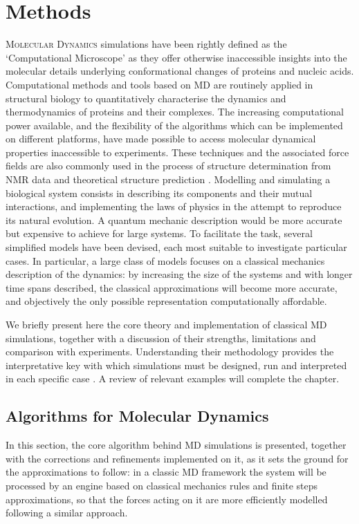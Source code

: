 \chapter{Methods} \label{chapter:MD}

\lettrine{M}{olecular Dynamics} simulations have been rightly defined as the `Computational Microscope' \cite{Lee2009,Dror2012} as they offer otherwise inaccessible insights into the molecular details underlying conformational changes of proteins and nucleic acids. Computational methods and tools based on MD are routinely applied in structural biology to quantitatively characterise the dynamics and thermodynamics of proteins and their complexes. The increasing computational power available, and the flexibility of the algorithms which can be implemented on different platforms, have made possible to access molecular dynamical properties inaccessible to experiments. These techniques and the associated force fields are also commonly used in the process of structure determination from NMR data and theoretical structure prediction \cite{Vogel2017,Heo2018}.
%
Modelling and simulating a biological system consists in describing its components and their mutual interactions, and implementing the laws of physics in the attempt to reproduce its natural evolution. A quantum mechanic description would be more accurate but expensive to achieve for large systems. To facilitate the task, several simplified models have been devised, each most suitable to investigate particular cases.
%
In particular, a large class of models focuses on a classical mechanics description of the dynamics: by increasing the size of the systems and with longer time spans described, the classical approximations will become more accurate, and objectively the only possible representation computationally affordable.

We briefly present here the core theory and implementation of classical MD simulations, together with a discussion of their strengths, limitations and comparison with experiments. Understanding their methodology provides the interpretative key with which simulations must be designed, run and interpreted in each specific case \cite{vanGunsteren2006}. A review of relevant examples will complete the chapter.


\section{Algorithms for Molecular Dynamics}

In this section, the core algorithm behind MD simulations is presented, together with the corrections and refinements implemented on it, as it sets the ground for the approximations to follow:
in a classic MD framework the system will be processed by an engine based on classical mechanics rules and finite steps approximations, so that the forces acting on it are more efficiently modelled following a similar approach.

